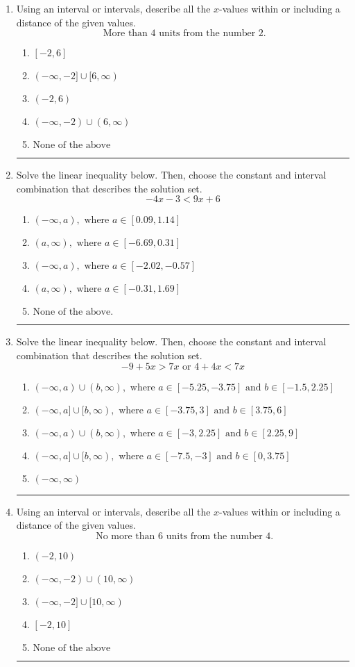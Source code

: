 \documentclass[14pt]{extbook}
\newcommand{\litem}[1]{\item#1\hspace*{-1cm}\rule{\textwidth}{0.4pt}}
\begin{document}
\begin{enumerate}
{\begin{enumerate}[label=\Alph*.]
\end{enumerate} }
\litem{
Using an interval or intervals, describe all the $x$-values within or including a distance of the given values.\[ \text{ More than } 4 \text{ units from the number } 2. \]\begin{enumerate}[label=\Alph*.]
\item \( [-2, 6] \)
\item \( (-\infty, -2] \cup [6, \infty) \)
\item \( (-2, 6) \)
\item \( (-\infty, -2) \cup (6, \infty) \)
\item \( \text{None of the above} \)

\end{enumerate} }
\litem{
Solve the linear inequality below. Then, choose the constant and interval combination that describes the solution set.\[ -4x -3 < 9x + 6 \]\begin{enumerate}[label=\Alph*.]
\item \( (-\infty, a), \text{ where } a \in [0.09, 1.14] \)
\item \( (a, \infty), \text{ where } a \in [-6.69, 0.31] \)
\item \( (-\infty, a), \text{ where } a \in [-2.02, -0.57] \)
\item \( (a, \infty), \text{ where } a \in [-0.31, 1.69] \)
\item \( \text{None of the above}. \)

\end{enumerate} }
\litem{
Solve the linear inequality below. Then, choose the constant and interval combination that describes the solution set.\[ -9 + 5 x > 7 x \text{ or } 4 + 4 x < 7 x \]\begin{enumerate}[label=\Alph*.]
\item \( (-\infty, a) \cup (b, \infty), \text{ where } a \in [-5.25, -3.75] \text{ and } b \in [-1.5, 2.25] \)
\item \( (-\infty, a] \cup [b, \infty), \text{ where } a \in [-3.75, 3] \text{ and } b \in [3.75, 6] \)
\item \( (-\infty, a) \cup (b, \infty), \text{ where } a \in [-3, 2.25] \text{ and } b \in [2.25, 9] \)
\item \( (-\infty, a] \cup [b, \infty), \text{ where } a \in [-7.5, -3] \text{ and } b \in [0, 3.75] \)
\item \( (-\infty, \infty) \)

\end{enumerate} }
\litem{
Using an interval or intervals, describe all the $x$-values within or including a distance of the given values.\[ \text{ No more than } 6 \text{ units from the number } 4. \]\begin{enumerate}[label=\Alph*.]
\item \( (-2, 10) \)
\item \( (-\infty, -2) \cup (10, \infty) \)
\item \( (-\infty, -2] \cup [10, \infty) \)
\item \( [-2, 10] \)
\item \( \text{None of the above} \)


\end{enumerate}}
\end{enumerate}
\end{document}
